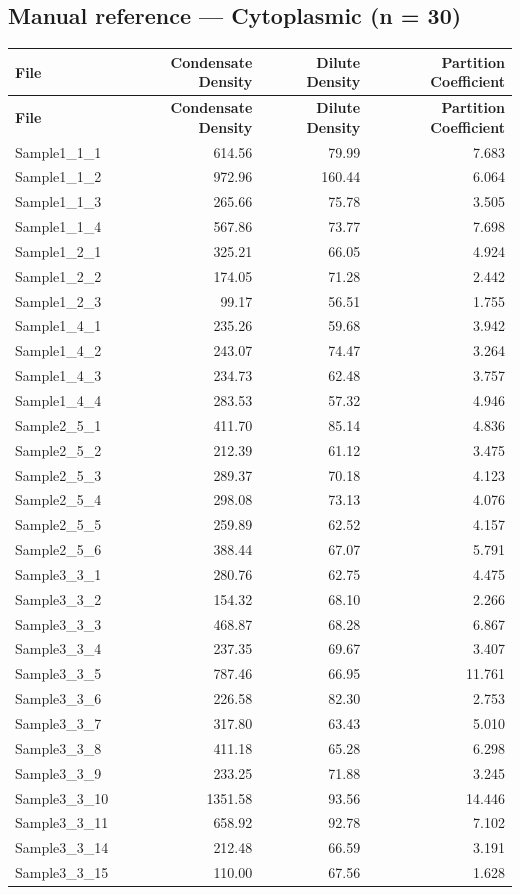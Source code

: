 \documentclass[11pt]{article}
\begin{document}
\subsection{Manual reference --- Cytoplasmic (n = 30)}
\begin{center}
\begin{longtable}{l r r r}
\toprule
\textbf{File} & \textbf{Condensate Density} & \textbf{Dilute Density} & \textbf{Partition Coefficient} \\
\midrule
\endfirsthead
\toprule
\textbf{File} & \textbf{Condensate Density} & \textbf{Dilute Density} & \textbf{Partition Coefficient} \\
\midrule
\endhead
\bottomrule
\endlastfoot
Sample1\_1\_1 & 614.56 & 79.99 & 7.683 \\
Sample1\_1\_2 & 972.96 & 160.44 & 6.064 \\
Sample1\_1\_3 & 265.66 & 75.78 & 3.505 \\
Sample1\_1\_4 & 567.86 & 73.77 & 7.698 \\
Sample1\_2\_1 & 325.21 & 66.05 & 4.924 \\
Sample1\_2\_2 & 174.05 & 71.28 & 2.442 \\
Sample1\_2\_3 & 99.17 & 56.51 & 1.755 \\
Sample1\_4\_1 & 235.26 & 59.68 & 3.942 \\
Sample1\_4\_2 & 243.07 & 74.47 & 3.264 \\
Sample1\_4\_3 & 234.73 & 62.48 & 3.757 \\
Sample1\_4\_4 & 283.53 & 57.32 & 4.946 \\
Sample2\_5\_1 & 411.70 & 85.14 & 4.836 \\
Sample2\_5\_2 & 212.39 & 61.12 & 3.475 \\
Sample2\_5\_3 & 289.37 & 70.18 & 4.123 \\
Sample2\_5\_4 & 298.08 & 73.13 & 4.076 \\
Sample2\_5\_5 & 259.89 & 62.52 & 4.157 \\
Sample2\_5\_6 & 388.44 & 67.07 & 5.791 \\
Sample3\_3\_1 & 280.76 & 62.75 & 4.475 \\
Sample3\_3\_2 & 154.32 & 68.10 & 2.266 \\
Sample3\_3\_3 & 468.87 & 68.28 & 6.867 \\
Sample3\_3\_4 & 237.35 & 69.67 & 3.407 \\
Sample3\_3\_5 & 787.46 & 66.95 & 11.761 \\
Sample3\_3\_6 & 226.58 & 82.30 & 2.753 \\
Sample3\_3\_7 & 317.80 & 63.43 & 5.010 \\
Sample3\_3\_8 & 411.18 & 65.28 & 6.298 \\
Sample3\_3\_9 & 233.25 & 71.88 & 3.245 \\
Sample3\_3\_10 & 1351.58 & 93.56 & 14.446 \\
Sample3\_3\_11 & 658.92 & 92.78 & 7.102 \\
Sample3\_3\_14 & 212.48 & 66.59 & 3.191 \\
Sample3\_3\_15 & 110.00 & 67.56 & 1.628 \\
\end{longtable}
\end{center}
\end{document}
